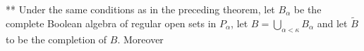 ** Under the same conditions as in the preceding theorem, let $B_\alpha$ be the complete Boolean algebra of regular open sets in $P_\alpha$, let $B = \bigcup_{\alpha < \kappa} B_\alpha$ and let $\tilde{B}$ to be the completion of $B$. Moreover
